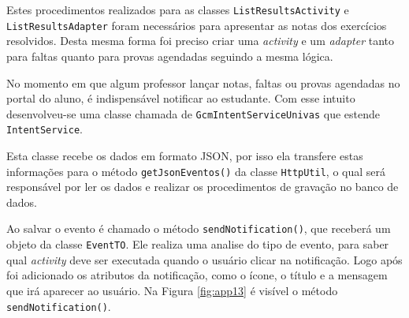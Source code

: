 	\par Estes procedimentos realizados para as classes
\texttt{ListResultsActivity} e \texttt{ListResultsAdapter} foram necessários
para apresentar as notas dos exercícios resolvidos. Desta mesma forma foi
preciso criar uma \textit{activity} e um \textit{adapter} tanto para faltas
quanto para provas agendadas seguindo a mesma lógica.

	\par No momento em que algum professor lançar notas, faltas ou provas agendadas
no portal do aluno, é indispensável notificar ao estudante. Com esse intuito
desenvolveu-se uma classe chamada de \texttt{GcmIntentServiceUnivas} que
estende \texttt{IntentService}.

	\par Esta classe recebe os dados em formato JSON, por isso ela transfere estas
informações para o método \texttt{getJsonEventos()} da classe
\texttt{HttpUtil}, o qual será responsável por ler os dados e realizar os
procedimentos de gravação no banco de dados.

	\par Ao salvar o evento é chamado o método \texttt{sendNotification()}, que
receberá um objeto da classe \texttt{EventTO}. Ele realiza uma analise do tipo
de evento, para saber qual \textit{activity} deve ser executada quando o
usuário clicar na notificação. Logo após foi adicionado os atributos da
notificação, como o ícone, o título e a mensagem que irá aparecer ao usuário.
Na Figura \ref{fig:app13} é visível o método \texttt{sendNotification()}.


